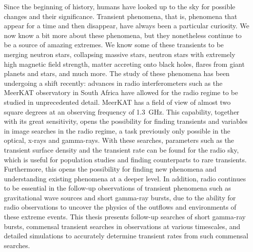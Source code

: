\documentclass[12pt]{article}
\begin{document}
Since the beginning of history, humans have looked up to the sky for possible changes and their significance. Transient phenomena, that is, phenomena that appear for a time and then disappear, have always been a particular curiosity. We now know a bit more about these phenomena, but they nonetheless continue to be a source of amazing extremes. We know some of these transients to be merging neutron stars, collapsing massive stars, neutron stars with extremely high magnetic field strength, matter accreting onto black holes, flares from giant planets and stars, and much more. The study of these phenomena has been undergoing a shift recently: advances in radio interferometers such as the MeerKAT observatory in South Africa have allowed for the radio regime to be studied in unprecedented detail. MeerKAT has a field of view of almost two square degrees at an observing frequency of 1.3~GHz. This capability, together with its great sensitivity, opens the possibility for finding transients and variables in image searches in the radio regime, a task previously only possible in the optical, x-rays and gamma-rays. With these searches, parameters such as the transient surface density and the transient rate can be found for the radio sky, which is useful for population studies and finding counterparts to rare transients. Furthermore, this opens the possibility for finding new phenomena and understanding existing phenomena at a deeper level. In addition, radio continues to be essential in the follow-up observations of transient phenomena such as gravitational wave sources and short gamma-ray bursts, due to the ability for radio observations to uncover the physics of the outflows and environments of these extreme events. This thesis presents follow-up searches of short gamma-ray bursts, commensal transient searches in observations at various timescales, and detailed simulations to accurately determine transient rates from such commensal searches.
\doublespacing
\newpage
\tableofcontents
\newpage
\cleardoublepage

{} \label{listoffig}
\begin{center}

\listoffigures
\end{center}
\newpage
\end{document}
